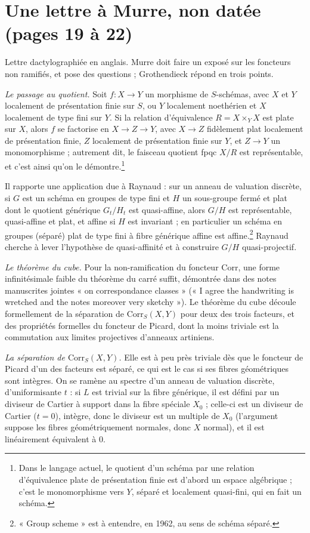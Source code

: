 \documentclass[11pt,a4paper]{article}
\begin{document}
\section*{Une lettre à Murre, non datée (pages 19 à 22)}

Lettre dactylographiée en anglais. Murre doit faire un exposé sur les foncteurs
non ramifiés, et pose des questions ; Grothendieck répond en trois points.

\emph{Le passage au quotient.} Soit $f \colon X \to Y$ un morphisme de
$S$-schémas, avec $X$ et $Y$ localement de présentation finie sur $S$, ou $Y$
localement noethérien et $X$ localement de type fini sur $Y$. Si la relation
d'équivalence $R = X \times_Y X$ est plate sur $X$, alors $f$ se factorise en
$X \to Z \to Y$, avec $X \to Z$ fidèlement plat localement de présentation
finie, $Z$ localement de présentation finie sur $Y$, et $Z \to Y$ un
monomorphisme ; autrement dit, le faisceau quotient fpqc $X/R$ est
représentable, et c'est ainsi qu'on le démontre.\footnote{Dans le langage
actuel, le quotient d'un schéma par une relation d'équivalence plate de
présentation finie est d'abord un espace algébrique ; c'est le monomorphisme
vers $Y$, séparé et localement quasi-fini, qui en fait un schéma.}

Il rapporte une application due à Raynaud : sur un anneau de valuation
discrète, si $G$ est un schéma en groupes de type fini et $H$ un sous-groupe
fermé et plat dont le quotient générique $G_t/H_t$ est quasi-affine, alors
$G/H$ est représentable, quasi-affine et plat, et affine si $H$ est invariant ;
en particulier un schéma en groupes (séparé) plat de type fini à fibre
générique affine est affine.\footnote{« Group scheme » est à entendre, en 1962,
au sens de schéma séparé.} Raynaud cherche à lever l'hypothèse de
quasi-affinité et à construire $G/H$ quasi-projectif.

\emph{Le théorème du cube.} Pour la non-ramification du foncteur
$\mathrm{Corr}$, une forme infinitésimale faible du théorème du carré suffit,
démontrée dans des notes manuscrites jointes « on correspondance
classes » (« I agree the handwriting is wretched and the notes moreover very
sketchy »). Le théorème du cube découle formellement de la séparation de
$\mathrm{Corr}_S(X, Y)$ pour deux des trois facteurs, et des propriétés
formelles du foncteur de Picard, dont la moins triviale est la commutation aux
limites projectives d'anneaux artiniens.

\emph{La séparation de $\mathrm{Corr}_S(X, Y)$.} Elle est à peu près triviale
dès que le foncteur de Picard d'un des facteurs est séparé, ce qui est le cas
si ses fibres géométriques sont intègres. On se ramène au spectre d'un anneau
de valuation discrète, d'uniformisante $t$ : si $L$ est trivial sur la fibre
générique, il est défini par un diviseur de Cartier à support dans la fibre
spéciale $X_0$ ; celle-ci est un diviseur de Cartier ($t = 0$), intègre, donc
le diviseur est un multiple de $X_0$ (l'argument suppose les fibres
géométriquement normales, donc $X$ normal), et il est linéairement équivalent
à $0$.
\end{document}

